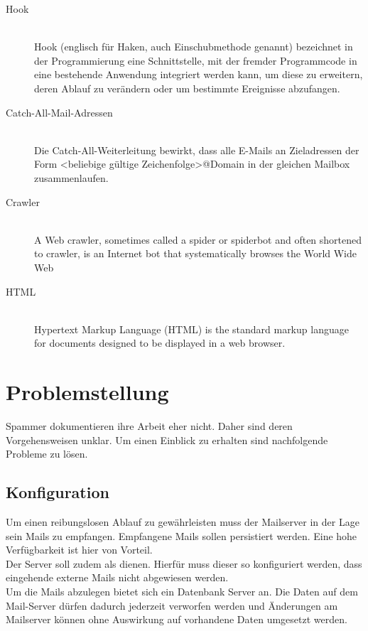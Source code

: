 \documentclass[a4paper,11pt,singlespacing]{article}
\begin{document}
\begin{description}
	\item[Hook\label{itm:Hook}]\hfill \\
		Hook (englisch für Haken, auch Einschubmethode genannt) bezeichnet in der Programmierung eine Schnittstelle, mit der fremder Programmcode in eine bestehende Anwendung integriert werden kann, um diese zu erweitern, deren Ablauf zu verändern oder um bestimmte Ereignisse abzufangen.\cite{Hook}
	\item[Catch-All-Mail-Adressen\label{itm:Catch-All-Mail}]\hfill \\
		Die Catch-All-Weiterleitung bewirkt, dass alle E-Mails an Zieladressen der Form <beliebige gültige Zeichenfolge>@Domain in der gleichen Mailbox zusammenlaufen.\cite{Catch-All-Mail}
	\item[Crawler\label{itm:crawler}]\hfill \\
		A Web crawler, sometimes called a spider or spiderbot and often shortened to crawler, is an Internet bot that systematically browses the World Wide Web \cite{crawler}
	\item[HTML\label{itm:HTML}]\hfill \\
		Hypertext Markup Language (HTML) is the standard markup language for documents designed to be displayed in a web browser.\cite{HTML}
	\end{description}

\newpage


\section{Problemstellung}\label{sec:Problemstellung}
	Spammer dokumentieren ihre Arbeit eher nicht.
	Daher sind deren Vorgehensweisen unklar.
	Um einen Einblick zu erhalten sind nachfolgende Probleme zu lösen.

	\subsection{Konfiguration}\label{sec:ProblemstellungKonfiguration}
		Um einen reibungslosen Ablauf zu gewährleisten muss der Mailserver in der Lage sein Mails zu empfangen.
		Empfangene Mails sollen persistiert werden.
		Eine hohe Verfügbarkeit ist hier von Vorteil.
		\\
		Der Server soll zudem als  dienen.
		Hierfür muss dieser so konfiguriert werden, dass eingehende externe Mails nicht abgewiesen werden.
		\\
		Um die Mails abzulegen bietet sich ein Datenbank Server an.
		Die Daten auf dem Mail-Server dürfen dadurch jederzeit verworfen werden und Änderungen am Mailserver können ohne Auswirkung auf vorhandene Daten umgesetzt werden.
\end{document}
